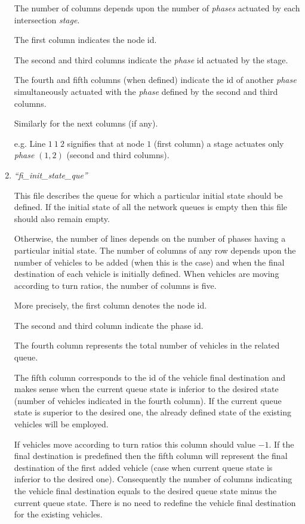 \documentclass[10pt, conference, compsocconf]{IEEEtran}
\begin{document}
\begin{enumerate}
The number of columns depends upon the number of \emph{phases} actuated by each intersection \emph{stage}.

The first column indicates the node id.

The second and third columns indicate the \emph{phase} id actuated by the stage.

The fourth and fifth columns (when defined) indicate  the id of another \emph{phase}  simultaneously actuated with the \emph{phase} defined by the second and third columns.

Similarly for the next columns (if any).

e.g. Line $1 \	1	\ 2$ signifies that at node $1$ (first column)  a stage actuates only \emph{phase} $(1,2)$ (second and third columns).

\item \emph{``fi\_init\_state\_que''}

This file describes the queue for which a particular initial state should be defined.
If the initial state of all the network queues is empty then this file should also remain empty.

Otherwise, the number of lines depends on the number of phases having a particular initial state.
The number of columns of any row depends upon the number of vehicles to be added (when this is the case) and when the final destination of each vehicle is initially defined.
When vehicles are moving according to turn ratios, the number of columns is  five.

More precisely, the first  column denotes the node id.

The second and third column indicate the phase id.

The  fourth column represents the total  number of vehicles in the related queue. 

The fifth column corresponds to the id of the vehicle final destination and makes sense when the current queue state is inferior to the desired state (number of vehicles indicated in the fourth column).
If the current queue state is superior to the desired one,  the already defined state of the existing vehicles will be employed.  

If vehicles move according to turn  ratios this column should value $-1$.
If the final destination is predefined then the fifth column will represent the final destination of the first added vehicle (case when current queue state is inferior to the desired one).
Consequently the number of columns indicating the vehicle final destination  equals to the desired queue state  minus the current queue state. There is no need to redefine the vehicle final destination for the existing vehicles. 


\end{enumerate}
\end{document}
